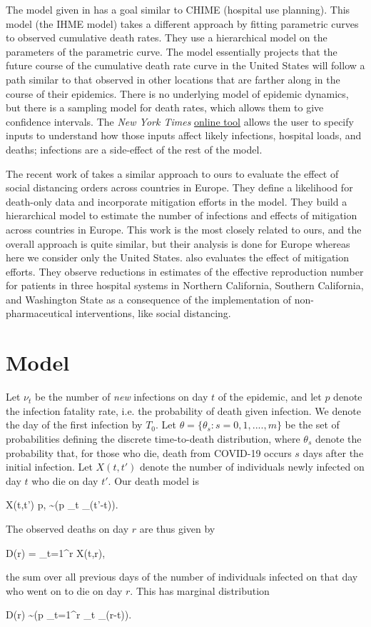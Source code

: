 \documentclass[11pt]{article}
\theoremstyle{plain}
\newcommand{\be}{\begin{equs}}
\newcommand{\ee}{\end{equs}}
\newcommand{\1}{\mathbf 1}
\DeclareMathOperator{\Pois}{Poisson}
\begin{document}
The model given in \citet{murrayteam2020forecast} has a goal similar to CHIME (hospital use planning). This model (the IHME model) takes a different approach by fitting parametric curves to observed cumulative death rates. They use a hierarchical model on the parameters of the parametric curve. The model essentially projects that the future course of the cumulative death rate curve in the United States will follow a path similar to that observed in other locations that are farther along in the course of their epidemics. There is no underlying model of epidemic dynamics, but there is a sampling model for death rates, which allows them to give confidence intervals. The \emph{New York Times} \href{https://www.nytimes.com/interactive/2020/03/25/opinion/coronavirus-trump-reopen-america.html}{online tool} allows the user to specify inputs to understand how those inputs affect likely infections, hospital loads, and deaths; infections are a side-effect of the rest of the model. 

The recent work of \citet{flaxman2020estimating} takes a similar approach to ours to evaluate the effect of social distancing orders across countries in Europe. They define a likelihood for death-only data and incorporate mitigation efforts in the model. They build a hierarchical model to estimate the number of infections and effects of mitigation across countries in Europe. This work is the most closely related to ours, and the overall approach is quite similar, but their analysis is done for Europe whereas here we consider only the United States. \citet{lewnard2020incidence} also evaluates the effect of mitigation efforts. They observe reductions in estimates of the effective reproduction number for patients in three hospital systems in Northern California, Southern California, and Washington State as a consequence of the implementation of non-pharmaceutical interventions, like social distancing. 

\section{Model}

Let $\nu_t$ be the number of \emph{new} infections on day $t$ of the epidemic, and let $p$ denote the infection fatality rate, i.e. the probability of death given infection. We denote the day of the first infection by $T_0$. Let $\theta = \{\theta_s : s = 0, 1, ...., m\}$ be the set of probabilities defining the discrete time-to-death distribution, where $\theta_s$ denote the probability that, for those who die, death from COVID-19 occurs $s$ days after the initial infection.  Let $X(t,t')$ denote the number of individuals newly infected on day $t$ who die on day $t'$. Our death model is
\be
X(t,t') \mid p, \theta \sim \Pois(p \nu_t \theta_{(t'-t)}).
\ee
The observed deaths on day $r$ are thus given by
\be
D(r) = \sum_{t=1}^r X(t,r),
\ee
the sum over all previous days of the number of individuals infected on that day who went on to die on day $r$. This has marginal distribution
\be \label{eq:Ddist}
D(r) \sim \Pois\left(p \sum_{t=1}^r \nu_t \theta_{(r-t)}\right).
\ee
\end{document}
